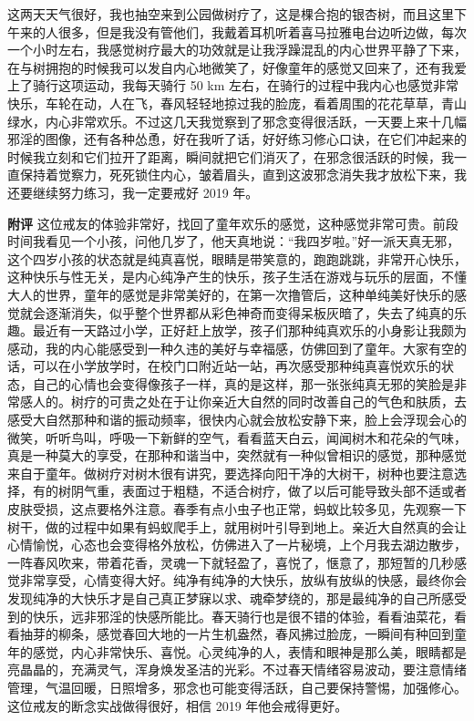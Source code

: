 \begin{case}
    这两天天气很好，我也抽空来到公园做树疗了，这是棵合抱的银杏树，而且这里下午来的人很多，但是我没有管他们，我戴着耳机听着喜马拉雅电台边听边做，每次一个小时左右，我感觉树疗最大的功效就是让我浮躁混乱的内心世界平静了下来，在与树拥抱的时候我可以发自内心地微笑了，好像童年的感觉又回来了，还有我爱上了骑行这项运动，我每天骑行 50 \unit{\km} 左右，在骑行的过程中我内心也感觉非常快乐，车轮在动，人在飞，春风轻轻地掠过我的脸庞，看着周围的花花草草，青山绿水，内心非常欢乐。不过这几天我觉察到了邪念变得很活跃，一天要上来十几幅邪淫的图像，还有各种怂恿，好在我听了话，好好练习修心口诀，在它们冲起来的时候我立刻和它们拉开了距离，瞬间就把它们消灭了，在邪念很活跃的时候，我一直保持着觉察力，死死锁住内心，皱着眉头，直到这波邪念消失我才放松下来，我还要继续努力练习，我一定要戒好 2019 年。

    \textbf{附评} 这位戒友的体验非常好，找回了童年欢乐的感觉，这种感觉非常可贵。前段时间我看见一个小孩，问他几岁了，他天真地说：“我四岁啦。”好一派天真无邪，这个四岁小孩的状态就是纯真喜悦，眼睛是带笑意的，跑跑跳跳，非常开心快乐，这种快乐与性无关，是内心纯净产生的快乐，孩子生活在游戏与玩乐的层面，不懂大人的世界，童年的感觉是非常美好的，在第一次撸管后，这种单纯美好快乐的感觉就会逐渐消失，似乎整个世界都从彩色神奇而变得呆板灰暗了，失去了纯真的乐趣。最近有一天路过小学，正好赶上放学，孩子们那种纯真欢乐的小身影让我颇为感动，我的内心能感受到一种久违的美好与幸福感，仿佛回到了童年。大家有空的话，可以在小学放学时，在校门口附近站一站，再次感受那种纯真喜悦欢乐的状态，自己的心情也会变得像孩子一样，真的是这样，那一张张纯真无邪的笑脸是非常感人的。树疗的可贵之处在于让你亲近大自然的同时改善自己的气色和肤质，去感受大自然那种和谐的振动频率，很快内心就会放松安静下来，脸上会浮现会心的微笑，听听鸟叫，呼吸一下新鲜的空气，看看蓝天白云，闻闻树木和花朵的气味，真是一种莫大的享受，在那种和谐当中，突然就有一种似曾相识的感觉，那种感觉来自于童年。做树疗对树木很有讲究，要选择向阳干净的大树干，树种也要注意选择，有的树阴气重，表面过于粗糙，不适合树疗，做了以后可能导致头部不适或者皮肤受损，这点要格外注意。春季有点小虫子也正常，蚂蚁比较多见，先观察一下树干，做的过程中如果有蚂蚁爬手上，就用树叶引导到地上。亲近大自然真的会让心情愉悦，心态也会变得格外放松，仿佛进入了一片秘境，上个月我去湖边散步，一阵春风吹来，带着花香，灵魂一下就轻盈了，喜悦了，惬意了，那短暂的几秒感觉非常享受，心情变得大好。纯净有纯净的大快乐，放纵有放纵的快感，最终你会发现纯净的大快乐才是自己真正梦寐以求、魂牵梦绕的，那是最纯净的自己所感受到的快乐，远非邪淫的快感所能比。春天骑行也是很不错的体验，看看油菜花，看看抽芽的柳条，感觉春回大地的一片生机盎然，春风拂过脸庞，一瞬间有种回到童年的感觉，内心非常快乐、喜悦。心灵纯净的人，表情和眼神是那么美，眼睛都是亮晶晶的，充满灵气，浑身焕发圣洁的光彩。不过春天情绪容易波动，要注意情绪管理，气温回暖，日照增多，邪念也可能变得活跃，自己要保持警惕，加强修心。这位戒友的断念实战做得很好，相信 2019 年他会戒得更好。
\end{case}

